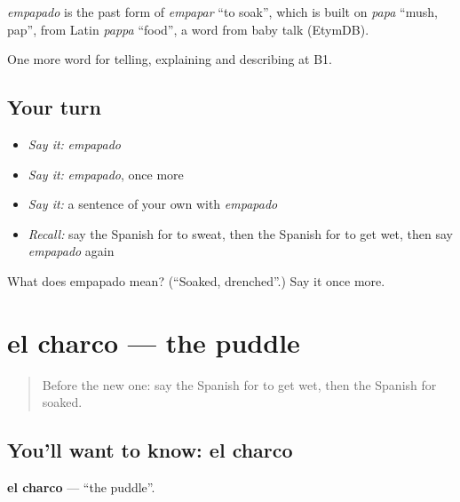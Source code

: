 \begin{cousinweb}
\emph{empapado} is the past form of \emph{empapar} \textquotedblleft{}to soak\textquotedblright{}, which is built on \emph{papa} \textquotedblleft{}mush, pap\textquotedblright{}, from Latin \emph{pappa} \textquotedblleft{}food\textquotedblright{}, a word from baby talk (EtymDB).
\end{cousinweb}

\begin{grammarlens}[title={What you've built}]
One more word for telling, explaining and describing at B1.
\end{grammarlens}

\subsection*{Your turn}
\begin{itemize}
\raggedright
  \item \emph{Say it:} \emph{empapado}
  \item \emph{Say it:} \emph{empapado}, once more
  \item \emph{Say it:} a sentence of your own with \emph{empapado}
  \item \emph{Recall:} say the Spanish for to sweat, then the Spanish for to get wet, then say \emph{empapado} again
\end{itemize}

\begin{tcolorbox}[breakable,colback=teal!4,colframe=teal!35!black,title={Before you move on}]
What does empapado mean? (\textquotedblleft{}Soaked, drenched\textquotedblright{}.) Say it once more.
\end{tcolorbox}
\section[el charco]{el charco — the puddle}

\label{lesson:ES-C702-charco}



\begin{quote}
Before the new one: say the Spanish for to get wet, then the Spanish for soaked.
\end{quote}

\subsection*{You'll want to know: el charco}
\textbf{el charco} — \textquotedblleft{}the puddle\textquotedblright{}.

